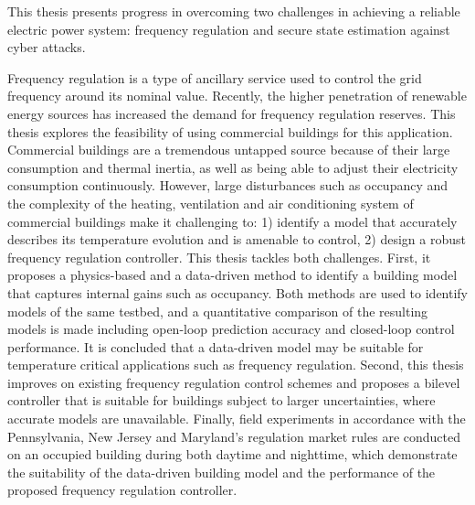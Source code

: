 \documentclass[12pt, oneside, final]{lib/ucthesis}
\begin{document}
\begin{frontmatter} 
\maketitle
\approvalpage
\copyrightpage
\abstract
This thesis presents progress in overcoming two challenges in achieving a reliable electric power system: frequency regulation and secure state estimation against cyber attacks.

Frequency regulation is a type of ancillary service used to control the grid frequency around its nominal value.
Recently, the higher penetration of renewable energy sources has increased the demand for frequency regulation reserves. 
This thesis explores the feasibility of using commercial buildings for this application.
Commercial buildings are a tremendous untapped source because of their large consumption and thermal inertia, as well as being able to adjust their electricity consumption continuously.
However, large disturbances such as occupancy and the complexity of the heating, ventilation and air conditioning system of commercial buildings make it challenging to: 1) identify a model that accurately describes its temperature evolution and is amenable to control, 2) design a robust frequency regulation controller.
This thesis tackles both challenges.
First, it proposes a physics-based and a data-driven method to identify a building model that captures internal gains such as occupancy.
Both methods are used to identify models of the same testbed, and a quantitative comparison of the resulting models is made including open-loop prediction accuracy and closed-loop control performance.
It is concluded that a data-driven model may be suitable for temperature critical applications such as frequency regulation.
Second, this thesis improves on existing frequency regulation control schemes and proposes a bilevel controller that is suitable for buildings subject to larger uncertainties, where accurate models are unavailable.
Finally, field experiments in accordance with the Pennsylvania, New Jersey and Maryland's regulation market rules are conducted on an occupied building during both daytime and nighttime, which demonstrate the suitability of the data-driven building model and the performance of the proposed frequency regulation controller.



\end{frontmatter}
\end{document}
